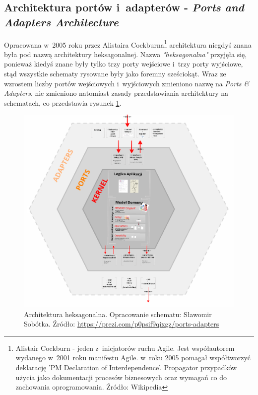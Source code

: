 \subsection{Architektura portów i~adapterów - \textit{Ports and Adapters \newline Architecture}}
Opracowana w~2005 roku przez Alistaira Cockburna\footnote{Alistair Cockburn - jeden z~inicjatorów ruchu Agile. Jest współautorem wydanego w~2001 roku manifestu Agile. w~roku 2005 pomagał współtworzyć deklarację 'PM Declaration of Interdependence'. Propagator przypadków użycia jako dokumentacji procesów biznesowych oraz wymagań co do zachowania oprogramowania. Źródło: Wikipedia} architektura niegdyś znana była pod nazwą architektury heksagonalnej\cite{website:architect:hexagonal}. Nazwa \textit{"heksagonalna"} przyjęła się, ponieważ kiedyś znane były tylko trzy porty wejściowe i~trzy porty wyjściowe, stąd wszystkie schematy rysowane były jako foremny sześciokąt. Wraz ze wzrostem liczby portów wejściowych i~wyjściowych zmieniono nazwę na \textit{Ports \& Adapters}, nie zmieniono natomiast zasady przedstawiania architektury na schematach, co przedstawia rysunek \ref{fig:hexagonal_architecture}.

\begin{figure}[!htb]
    \centering
    \includegraphics[width=13cm]{imgs/ch4_hexagonal_architecture_2.png}
    \caption
{Architektura heksagonalna. Opracowanie schematu: Sławomir Sobótka. Źródło: \url{https://prezi.com/p0psif9qixgz/ports-adapters}}
    \label{fig:hexagonal_architecture}
\end{figure} 


